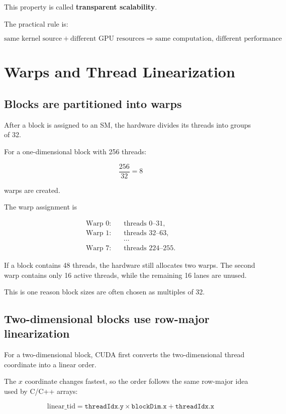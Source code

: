 \documentclass[11pt,a4paper]{article}
\begin{document}
This property is called \textbf{transparent scalability}.

The practical rule is:

\[
\boxed{
\text{same kernel source}
+
\text{different GPU resources}
\Rightarrow
\text{same computation, different performance}
}
\]

\section{Warps and Thread Linearization}

\subsection{Blocks are partitioned into warps}

After a block is assigned to an SM, the hardware divides its threads into groups of 32.

For a one-dimensional block with 256 threads:

\[
\frac{256}{32}=8
\]

warps are created.

The warp assignment is

\[
\begin{aligned}
\text{Warp 0}:&\quad \text{threads }0\text{--}31,\\
\text{Warp 1}:&\quad \text{threads }32\text{--}63,\\
&\quad \cdots\\
\text{Warp 7}:&\quad \text{threads }224\text{--}255.
\end{aligned}
\]

If a block contains 48 threads, the hardware still allocates two warps. The second warp contains only 16 active threads, while the remaining 16 lanes are unused.

This is one reason block sizes are often chosen as multiples of 32.

\subsection{Two-dimensional blocks use row-major linearization}

For a two-dimensional block, CUDA first converts the two-dimensional thread coordinate into a linear order.

The \(x\) coordinate changes fastest, so the order follows the same row-major idea used by C/C++ arrays:

\[
\boxed{
\text{linear\_tid}
=
\texttt{threadIdx.y}\times\texttt{blockDim.x}
+
\texttt{threadIdx.x}
}
\]
\end{document}

